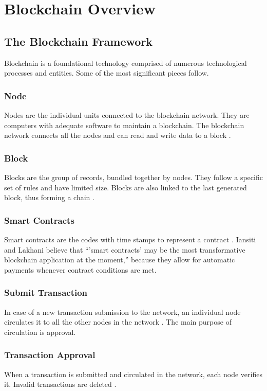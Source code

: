 \documentclass[sigconf]{acmart}
\begin{document}
\section{Blockchain Overview}
\subsection{The Blockchain Framework}
Blockchain is a foundational technology comprised of numerous technological processes and entities. Some of the most significant pieces follow.

\subsubsection{Node} Nodes are the individual units connected to the blockchain network. They are computers with adequate software to maintain a blockchain. The blockchain network connects all the nodes and can read and write data to a block \cite{pabc1} \cite{pabc2}.

\subsubsection{Block} Blocks are the group of records, bundled together by nodes. They follow a specific set of rules and have limited size. Blocks are also linked to the last generated block, thus forming a chain \cite{pabc1}.

\subsubsection{Smart Contracts} Smart contracts are the codes with time stamps to represent a contract \cite{pabc1}. Iansiti and Lakhani \cite{hbr} believe that ``'smart contracts' may be the most transformative blockchain application at the moment,'' because they allow for automatic payments whenever contract conditions are met. 

\subsubsection{Submit Transaction} In case of a new transaction submission to the network, an individual node circulates it to all the other nodes in the network \cite{pabc1}. The main purpose of circulation is approval. 

\subsubsection{Transaction Approval} When a transaction is submitted and circulated in the network, each node verifies it. Invalid transactions are deleted \cite{pabc1}.
\end{document}
